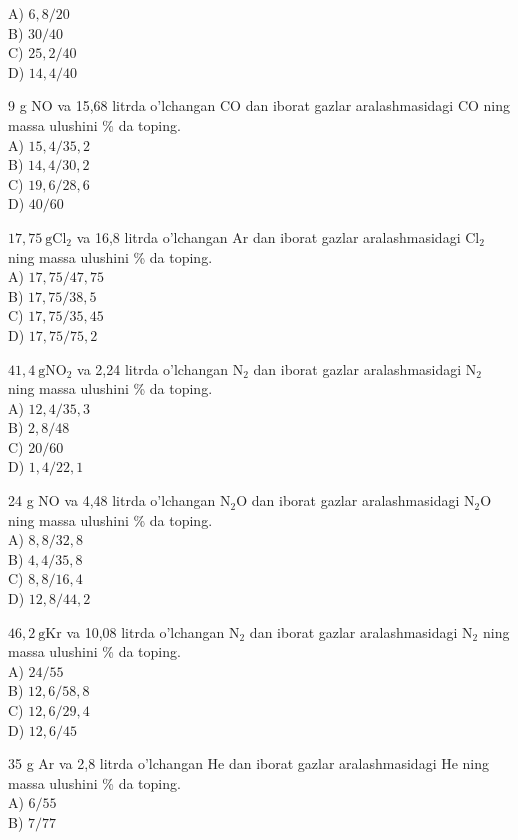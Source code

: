 A) $6,8 / 20$\\
B) $30 / 40$\\
C) $25,2 / 40$\\
D) $14,4 / 40$
  \item 9 g NO va 15,68 litrda o'lchangan CO dan iborat gazlar aralashmasidagi CO ning massa ulushini \% da toping.\\
A) $15,4 / 35,2$\\
B) $14,4 / 30,2$\\
C) $19,6 / 28,6$\\
D) $40 / 60$
  \item $17,75 \mathrm{~g} \mathrm{Cl}_{2}$ va 16,8 litrda o'lchangan Ar dan iborat gazlar aralashmasidagi $\mathrm{Cl}_{2}$ ning massa ulushini \% da toping.\\
A) $17,75 / 47,75$\\
B) $17,75 / 38,5$\\
C) $17,75 / 35,45$\\
D) $17,75 / 75,2$
  \item $41,4 \mathrm{~g} \mathrm{NO}_{2}$ va 2,24 litrda o'lchangan $\mathrm{N}_{2}$ dan iborat gazlar aralashmasidagi $\mathrm{N}_{2}$ ning massa ulushini \% da toping.\\
A) $12,4 / 35,3$\\
B) $2,8 / 48$\\
C) $20 / 60$\\
D) $1,4 / 22,1$
  \item 24 g NO va 4,48 litrda o'lchangan $\mathrm{N}_{2} \mathrm{O}$ dan iborat gazlar aralashmasidagi $\mathrm{N}_{2} \mathrm{O}$ ning massa ulushini \% da toping.\\
A) $8,8 / 32,8$\\
B) $4,4 / 35,8$\\
C) $8,8 / 16,4$\\
D) $12,8 / 44,2$
  \item $46,2 \mathrm{~g} \mathrm{Kr}$ va 10,08 litrda o'lchangan $\mathrm{N}_{2}$ dan iborat gazlar aralashmasidagi $\mathrm{N}_{2}$ ning massa ulushini \% da toping.\\
A) $24 / 55$\\
B) $12,6 / 58,8$\\
C) $12,6 / 29,4$\\
D) $12,6 / 45$
  \item 35 g Ar va 2,8 litrda o'lchangan He dan iborat gazlar aralashmasidagi He ning massa ulushini \% da toping.\\
A) $6 / 55$\\
B) $7 / 77$\\
